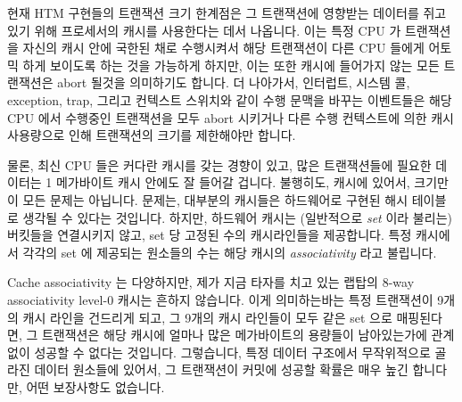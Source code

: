 현재 HTM 구현들의 트랜잭션 크기 한계점은 그 트랜잭션에 영향받는 데이터를 쥐고
있기 위해 프로세서의 캐시를 사용한다는 데서 나옵니다.
이는 특정 CPU 가 트랜잭션을 자신의 캐시 안에 국한된 채로 수행시켜서 해당
트랜잭션이 다른 CPU 들에게 어토믹 하게 보이도록 하는 것을 가능하게 하지만, 이는
또한 캐시에 들어가지 않는 모든 트랜잭션은 abort 될것을 의미하기도 합니다.
더 나아가서, 인터럽트, 시스템 콜, exception, trap, 그리고 컨텍스트 스위치와
같이 수행 문맥을 바꾸는 이벤트들은 해당 CPU 에서 수행중인 트랜잭션을 모두 abort
시키거나 다른 수행 컨텍스트에 의한 캐시 사용량으로 인해 트랜잭션의 크기를
제한해야만 합니다.

물론, 최신 CPU 들은 커다란 캐시를 갖는 경향이 있고, 많은 트랜잭션들에 필요한
데이터는 1 메가바이트 캐시 안에도 잘 들어갈 겁니다.
불행히도, 캐시에 있어서, 크기만이 모든 문제는 아닙니다.
문제는, 대부분의 캐시들은 하드웨어로 구현된 해시 테이블로 생각될 수 있다는
것입니다.
하지만, 하드웨어 캐시는 (일반적으로 \emph{set} 이라 불리는) 버킷들을 연결시키지
않고, set 당 고정된 수의 캐시라인들을 제공합니다.
특정 캐시에서 각각의 set 에 제공되는 원소들의 수는 해당 캐시의
\emph{associativity} 라고 불립니다.
\iffalse

The transaction-size limitations of current HTM implementations
stem from the use of the processor caches to hold the data
affected by the transaction.
Although this allows a given CPU to make the transaction appear atomic to
other CPUs by executing the transaction within the confines of its cache,
it also means that any transaction that does not fit must be aborted.
Furthermore, events that change execution context, such as interrupts,
system calls, exceptions, traps, and context switches either must
abort any ongoing transaction on the CPU in question or must further
restrict transaction size due to the cache footprint of the other
execution context.

Of course, modern CPUs tend to have large caches, and the data required
for many transactions would fit easily in a one-megabyte cache.
Unfortunately, with caches, sheer size is not all that matters.
The problem is that most caches
can be thought of hash tables implemented in hardware.
However, hardware caches do not chain their buckets (which are normally
called \emph{sets}), but rather
provide a fixed number of cachelines per set.
The number of elements provided for each set in a given cache
is termed that cache's \emph{associativity}.
\fi

Cache associativity 는 다양하지만, 제가 지금 타자를 치고 있는 랩탑의 8-way
associativity level-0 캐시는 흔하지 않습니다.
이게 의미하는바는 특정 트랜잭션이 9개의 캐시 라인을 건드리게 되고, 그 9개의
캐시 라인들이 모두 같은 set 으로 매핑된다면, 그 트랜잭션은 해당 캐시에 얼마나
많은 메가바이트의 용량들이 남아있는가에 관계없이 성공할 수 없다는 것입니다.
그렇습니다, 특정 데이터 구조에서 무작위적으로 골라진 데이터 원소들에 있어서, 그
트랜잭션이 커밋에 성공할 확률은 매우 높긴 합니다만, 어떤 보장사항도 없습니다.

